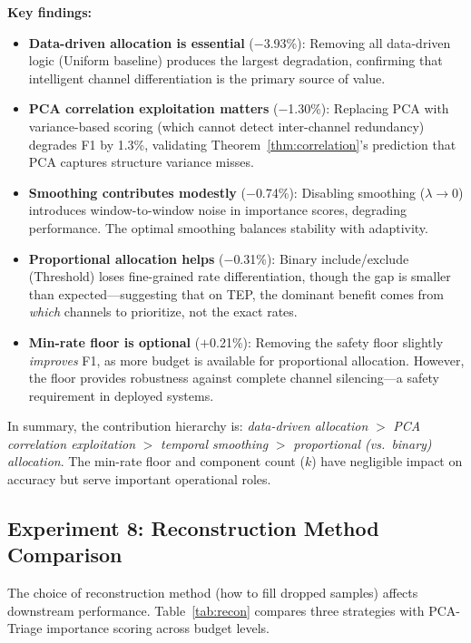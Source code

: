 \documentclass[journal]{IEEEtran}
\begin{document}
\textbf{Key findings:}
\begin{itemize}[leftmargin=*]
\item \textbf{Data-driven allocation is essential} ($-$3.93\%): Removing all data-driven logic (Uniform baseline) produces the largest degradation, confirming that intelligent channel differentiation is the primary source of value.
\item \textbf{PCA correlation exploitation matters} ($-$1.30\%): Replacing PCA with variance-based scoring (which cannot detect inter-channel redundancy) degrades F1 by 1.3\%, validating Theorem~\ref{thm:correlation}'s prediction that PCA captures structure variance misses.
\item \textbf{Smoothing contributes modestly} ($-$0.74\%): Disabling smoothing ($\lambda \to 0$) introduces window-to-window noise in importance scores, degrading performance. The optimal smoothing balances stability with adaptivity.
\item \textbf{Proportional allocation helps} ($-$0.31\%): Binary include/exclude (Threshold) loses fine-grained rate differentiation, though the gap is smaller than expected---suggesting that on TEP, the dominant benefit comes from \textit{which} channels to prioritize, not the exact rates.
\item \textbf{Min-rate floor is optional} ($+$0.21\%): Removing the safety floor slightly \textit{improves} F1, as more budget is available for proportional allocation. However, the floor provides robustness against complete channel silencing---a safety requirement in deployed systems.
\end{itemize}

In summary, the contribution hierarchy is: \textit{data-driven allocation} $>$ \textit{PCA correlation exploitation} $>$ \textit{temporal smoothing} $>$ \textit{proportional (vs.\ binary) allocation}. The min-rate floor and component count ($k$) have negligible impact on accuracy but serve important operational roles.

\subsection{Experiment 8: Reconstruction Method Comparison}

The choice of reconstruction method (how to fill dropped samples) affects downstream performance. Table~\ref{tab:recon} compares three strategies with PCA-Triage importance scoring across budget levels.
\end{document}
